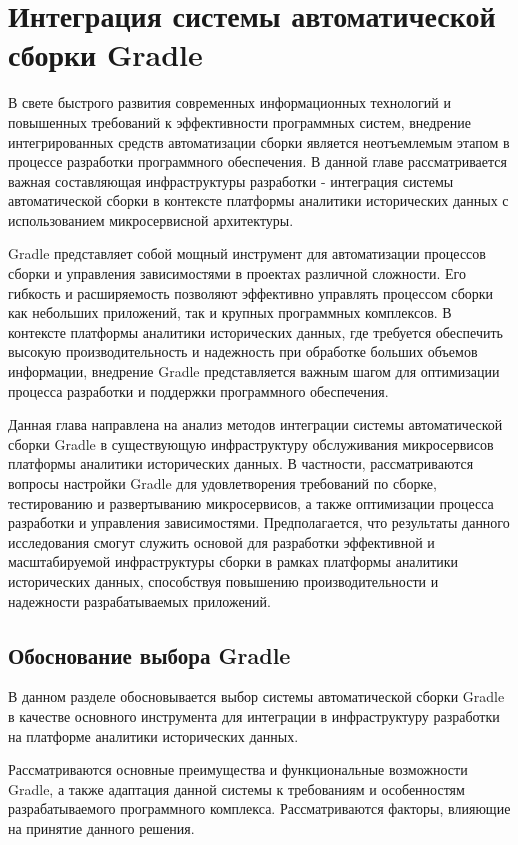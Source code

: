 \chapter{Интеграция системы автоматической сборки Gradle}\label{ch:----gradle}

В свете быстрого развития современных информационных технологий и повышенных требований к
эффективности программных систем, внедрение интегрированных средств автоматизации сборки является
неотъемлемым этапом в процессе разработки программного обеспечения.
В данной главе рассматривается
важная составляющая инфраструктуры разработки - интеграция системы автоматической сборки в
контексте платформы аналитики исторических данных с использованием микросервисной архитектуры.

Gradle представляет собой мощный инструмент для автоматизации процессов сборки и управления
зависимостями в проектах различной сложности.
Его гибкость и расширяемость позволяют эффективно
управлять процессом сборки как небольших приложений, так и крупных программных комплексов.
В
контексте платформы аналитики исторических данных, где требуется обеспечить высокую
производительность и надежность при обработке больших объемов информации, внедрение Gradle
представляется важным шагом для оптимизации процесса разработки и поддержки программного
обеспечения.

Данная глава направлена на анализ методов интеграции системы автоматической сборки Gradle
в существующую инфраструктуру обслуживания микросервисов платформы аналитики исторических данных.
В
частности, рассматриваются вопросы настройки Gradle для удовлетворения требований по сборке,
тестированию и развертыванию микросервисов, а также оптимизации процесса разработки и управления
зависимостями.
Предполагается, что результаты данного исследования смогут служить основой для
разработки эффективной и масштабируемой инфраструктуры сборки в рамках платформы аналитики
исторических данных, способствуя повышению производительности и надежности разрабатываемых
приложений.


\section{Обоснование выбора Gradle}\label{sec:--gradle}

В данном разделе обосновывается выбор системы автоматической сборки Gradle в качестве основного
инструмента для интеграции в инфраструктуру разработки на платформе аналитики исторических данных.

Рассматриваются основные преимущества и функциональные возможности Gradle, а также адаптация данной
системы к требованиям и особенностям разрабатываемого программного комплекса.
Рассматриваются
факторы, влияющие на принятие данного решения.

